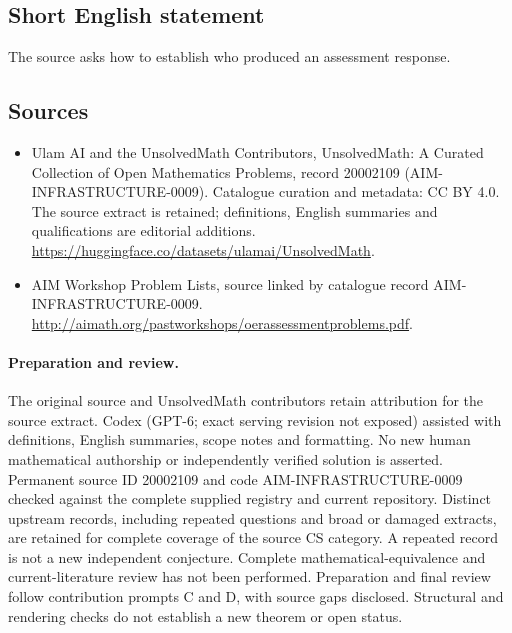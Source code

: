 \documentclass[11pt]{article}
\begin{document}
\subsection{Short English statement}
The source asks how to establish who produced an assessment response.
\subsection{Sources}
\begin{itemize}
\item[\hypertarget{source:20002109:1}{S1}] Ulam AI and the UnsolvedMath Contributors, UnsolvedMath: A Curated Collection of Open Mathematics Problems, record 20002109 (AIM-INFRASTRUCTURE-0009). Catalogue curation and metadata: CC BY 4.0. The source extract is retained; definitions, English summaries and qualifications are editorial additions.
\url{https://huggingface.co/datasets/ulamai/UnsolvedMath}.
\item[\hypertarget{source:20002109:2}{S2}] AIM Workshop Problem Lists, source linked by catalogue record AIM-INFRASTRUCTURE-0009.
\url{http://aimath.org/pastworkshops/oerassessmentproblems.pdf}.
\end{itemize}
\paragraph{Preparation and review.}
The original source and UnsolvedMath contributors retain attribution for the source extract. Codex (GPT-6; exact serving revision not exposed) assisted with definitions, English summaries, scope notes and formatting. No new human mathematical authorship or independently verified solution is asserted. Permanent source ID 20002109 and code AIM-INFRASTRUCTURE-0009 checked against the complete supplied registry and current repository. Distinct upstream records, including repeated questions and broad or damaged extracts, are retained for complete coverage of the source CS category. A repeated record is not a new independent conjecture. Complete mathematical-equivalence and current-literature review has not been performed. Preparation and final review follow contribution prompts C and D, with source gaps disclosed. Structural and rendering checks do not establish a new theorem or open status.
\label{end:20002109}
\end{document}
